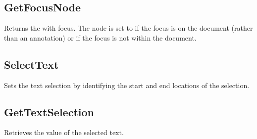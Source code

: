 \documentclass[letterpaper,12pt,english,openany,oneside]{sphinxmanual}
\begin{document}
\begin{sphinxVerbatim}[commandchars=\\\{\}]
 
 
 
\end{sphinxVerbatim}


\subsection{GetFocusNode}
\label{\detokenize{Access_DOM:getfocusnode}}
Returns the  with focus. The node is set to  if the focus is on the document (rather than an annotation) or if the focus is not within the document.

\begin{sphinxVerbatim}[commandchars=\\\{\}]
 
 
\end{sphinxVerbatim}


\subsection{SelectText}
\label{\detokenize{Access_DOM:selecttext}}
Sets the text selection by identifying the start and end locations of the selection.

\begin{sphinxVerbatim}[commandchars=\\\{\}]
 
 
 
 
 
\end{sphinxVerbatim}


\subsection{GetTextSelection}
\label{\detokenize{Access_DOM:gettextselection}}
Retrieves the value of the selected text.

\begin{sphinxVerbatim}[commandchars=\\\{\}]
 
 
\end{sphinxVerbatim}
\end{document}
